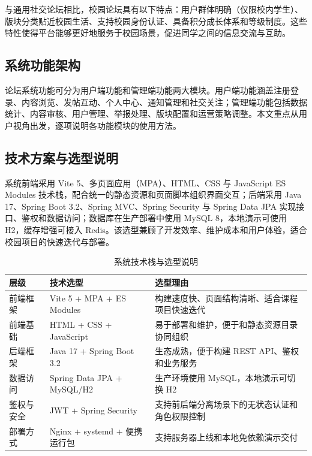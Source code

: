\documentclass[bwprint]{report}
\begin{document}
与通用社交论坛相比，校园论坛具有以下特点：用户群体明确（仅限校内学生）、版块分类贴近校园生活、支持校园身份认证、具备积分成长体系和等级制度。这些特性使得平台能够更好地服务于校园场景，促进同学之间的信息交流与互助。

\subsection{系统功能架构}
论坛系统功能可分为用户端功能和管理端功能两大模块。用户端功能涵盖注册登录、内容浏览、发帖互动、个人中心、通知管理和社交关注；管理端功能包括数据统计、内容审核、用户管理、举报处理、版块配置和运营策略调整。本文重点从用户视角出发，逐项说明各功能模块的使用方法。

\subsection{技术方案与选型说明}
系统前端采用 Vite 5、多页面应用（MPA）、HTML、CSS 与 JavaScript ES Modules 技术栈，配合统一的静态资源和页面脚本组织界面交互；后端采用 Java 17、Spring Boot 3.2、Spring MVC、Spring Security 与 Spring Data JPA 实现接口、鉴权和数据访问；数据库在生产部署中使用 MySQL 8，本地演示可使用 H2，缓存增强可接入 Redis。该选型兼顾了开发效率、维护成本和用户体验，适合校园项目的快速迭代与部署。

\begin{table}[!htbp]
    \caption{系统技术栈与选型说明}
    \label{tab:tech-stack}
    \centering
    \small
    \begin{tabular}{p{}p{}p{}}
        \toprule[1.5pt]
        层级 & 技术选型 & 选型理由 \\
        \midrule[1pt]
        前端框架 & Vite 5 + MPA + ES Modules & 构建速度快、页面结构清晰、适合课程项目快速迭代 \\
        前端基础 & HTML + CSS + JavaScript & 易于部署和维护，便于和静态资源目录协同组织 \\
        后端框架 & Java 17 + Spring Boot 3.2 & 生态成熟，便于构建 REST API、鉴权和业务服务 \\
        数据访问 & Spring Data JPA + MySQL/H2 & 生产环境使用 MySQL，本地演示可切换 H2 \\
        鉴权与安全 & JWT + Spring Security & 支持前后端分离场景下的无状态认证和角色权限控制 \\
        部署方式 & Nginx + systemd + 便携运行包 & 支持服务器上线和本地免依赖演示交付 \\
        \bottomrule[1.5pt]
    \end{tabular}
\end{table}
\end{document}
